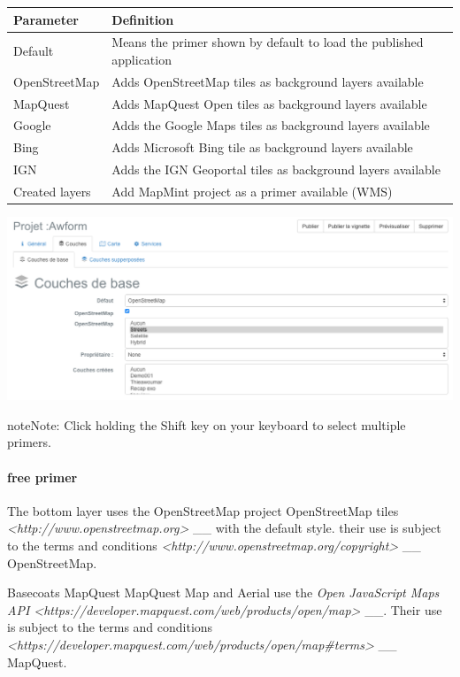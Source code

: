 \documentclass[letterpaper,10pt,english]{sphinxmanual}
\begin{document}
\begin{tabulary}{\linewidth}{|L|L|}
\hline

\textbf{Parameter}
 & 
\textbf{Definition}
\\
\hline
Default
 & 
Means the primer shown by default to load the published application
\\
\hline
OpenStreetMap
 & 
Adds OpenStreetMap tiles as background layers available
\\
\hline
MapQuest
 & 
Adds MapQuest Open tiles as background layers available
\\
\hline
Google
 & 
Adds the Google Maps tiles as background layers available
\\
\hline
Bing
 & 
Adds Microsoft Bing tile as background layers available
\\
\hline
IGN
 & 
Adds the IGN Geoportal tiles as background layers available
\\
\hline
Created layers
 & 
Add MapMint project as a primer available (WMS)
\\
\hline\end{tabulary}


\includegraphics[width=1.000\linewidth]{publisher-baselayers-conf.png}

\begin{notice}{note}{Note:}
Click holding the Shift key on your keyboard to select multiple primers.
\end{notice}
\paragraph{free primer}

The bottom layer uses the OpenStreetMap project OpenStreetMap tiles \emph{\textless{}http://www.openstreetmap.org\textgreater{}} \_\_ with the default style. their use is subject to the terms and conditions \emph{\textless{}http://www.openstreetmap.org/copyright\textgreater{}} \_\_ OpenStreetMap.

Basecoats MapQuest MapQuest Map and Aerial use the \emph{Open JavaScript Maps API \textless{}https://developer.mapquest.com/web/products/open/map\textgreater{}} \_\_. Their use is subject to the terms and conditions \emph{\textless{}https://developer.mapquest.com/web/products/open/map\#terms\textgreater{}} \_\_ MapQuest.
\end{document}
